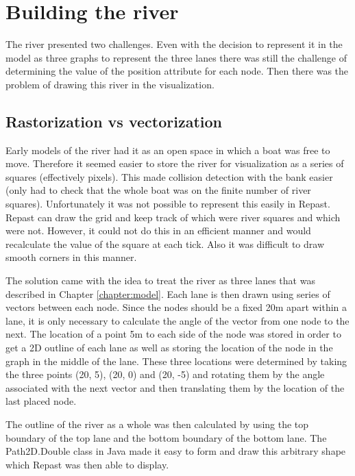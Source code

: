   \section{Building the river}\label{techissues:river}
    The river presented two challenges. Even with the decision to represent it in the model as three graphs to represent the three lanes there was still the challenge of determining the value of the position attribute for each node. Then there was the problem of drawing this river in the visualization.
    
    \subsection{Rastorization vs vectorization}
      Early models of the river had it as an open space in which a
      boat was free to move. Therefore it seemed easier to store the
      river for visualization as a series of squares (effectively
      pixels). This made collision detection with the bank easier
      (only had to check that the whole boat was on the finite number
      of river squares). Unfortunately it was not possible to
      represent this easily in Repast. Repast can draw the grid and
      keep track of which were river squares and which were
      not. However, it could not do this in an efficient manner and
      would recalculate the value of the square at each tick. Also it
      was difficult to draw smooth corners in this manner.
      
      The solution came with the idea to treat the river as three lanes that was described in Chapter \ref{chapter:model}. Each lane is then drawn using series of vectors between each node. Since the nodes should be a fixed 20m apart within a lane, it is only necessary to calculate the angle of the vector from one node to the next. The location of a point 5m to each side of the node was stored in order to get a 2D outline of each lane as well as storing the location of the node in the graph in the middle of the lane. These three locations were determined by taking the three points (20, 5), (20, 0) and (20, -5) and rotating them by the angle associated with the next vector and then translating them by the location of the last placed node. 
      
      The outline of the river as a whole was then calculated by using the top boundary of the top lane and the bottom boundary of the bottom lane. The Path2D.Double class in Java made it easy to form and draw this arbitrary shape which Repast was then able to display. 
      
